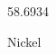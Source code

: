 \documentclass[12pt]{article}
\begin{document}
\hfill{}
\vfill
\begin{center}
  {\fontsize{50}{60}
  }

  58.6934

Nickel
\end{center}
\vfill
\end{document}
